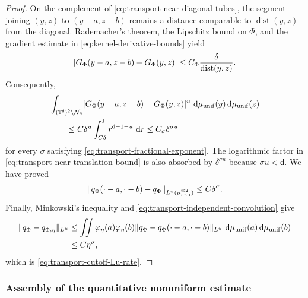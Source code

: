\documentclass[11pt,reqno]{amsart}
\numberwithin{equation}{section}
\theoremstyle{plain}
\theoremstyle{definition}
\DeclarePairedDelimiter{\abs}{\lvert}{\rvert}
\DeclarePairedDelimiter{\norm}{\lVert}{\rVert}
\renewcommand{\d}{\mathsf d}
\newcommand{\dd}{\mathop{}\!\mathrm d}
\newcommand{\T}{\mathbb T}
\newcommand{\muunif}{\mu_{\mathrm{unif}}}
\begin{document}
\begin{proof}
On the complement of \eqref{eq:transport-near-diagonal-tubes}, the segment joining $(y,z)$ to $(y-a,z-b)$ remains a distance comparable to $\operatorname{dist}(y,z)$ from the diagonal.  Rademacher's theorem, the Lipschitz bound on $\Phi$, and the gradient estimate in \eqref{eq:kernel-derivative-bounds} yield
\begin{equation}
 \abs{G_\Phi(y-a,z-b)-G_\Phi(y,z)}
 \leq C_\Phi\frac{\delta}{\operatorname{dist}(y,z)}.
 \label{eq:transport-far-translation-pointwise}
\end{equation}
Consequently,
\begin{align}
 &\int_{(\T^{\d})^2\setminus\mathcal N_\delta}
 \abs{G_\Phi(y-a,z-b)-G_\Phi(y,z)}^u
 \,\dd\muunif(y)\dd\muunif(z)
 \notag\\
 &\qquad\leq C\delta^u
 \int_{C\delta}^1r^{\d-1-u}\,\dd r
 \leq C_\sigma\delta^{\sigma u}
 \label{eq:transport-far-translation-integral}
\end{align}
for every $\sigma$ satisfying \eqref{eq:transport-fractional-exponent}.  The logarithmic factor in \eqref{eq:transport-near-translation-bound} is also absorbed by $\delta^{\sigma u}$ because $\sigma u<\d$.  We have proved
\begin{equation}
 \norm{q_\Phi(\cdot-a,\cdot-b)-q_\Phi}_{L^u(\muunif^{\otimes2})}
 \leq C\delta^\sigma.
 \label{eq:transport-translation-modulus}
\end{equation}
Finally, Minkowski's inequality and \eqref{eq:transport-independent-convolution} give
\begin{align}
 \norm{q_\Phi-q_{\Phi,\eta}}_{L^u}
 &\leq\iint\varphi_\eta(a)\varphi_\eta(b)
 \norm{q_\Phi-q_\Phi(\cdot-a,\cdot-b)}_{L^u}
 \,\dd\muunif(a)\dd\muunif(b)
 \notag\\
 &\leq C\eta^\sigma,
 \label{eq:transport-convolution-approximation}
\end{align}
which is \eqref{eq:transport-cutoff-Lu-rate}.
\end{proof}

\subsubsection{Assembly of the quantitative nonuniform estimate}
\end{document}
